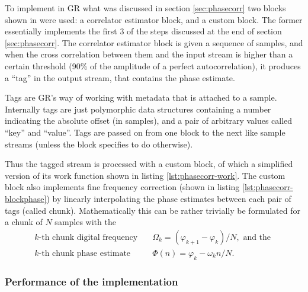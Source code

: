 To implement in GR what was discussed in section \ref{sec:phasecorr} two blocks shown in  were used: a correlator estimator block, and a custom block. The former essentially implements the first 3 of the steps discussed at the end of section \ref{sec:phasecorr}. The correlator estimator block is given a sequence of samples, and when the cross correlation between them and the input stream is higher than a certain threshold (90\% of the amplitude of a perfect autocorrelation), it produces a ``tag'' in the output stream, that contains the phase estimate.

Tags are GR's way of working with metadata that is attached to a sample. Internally tags are just polymorphic data structures containing a number indicating the absolute offset (in samples), and a pair of arbitrary values called ``key'' and ``value''. Tags are passed on from one block to the next like sample streams (unless the block specifies to do otherwise).

Thus the tagged stream is processed with a custom block, of which a simplified version of its work function shown in listing \ref{lst:phasecorr-work}. The custom block also implements fine frequency correction (shown in listing \ref{lst:phasecorr-blockphase}) by linearly interpolating the phase estimates between each pair of tags (called chunk). Mathematically this can be rather trivially be formulated for a chunk of \(N\) samples with the
\begin{subequations}
	\begin{align}
		k\text{-th chunk digital frequency} \quad  & \Omega_k = (\varphi_{k+1} - \varphi_k) / N, \text{ and the }\\
		k\text{-th chunk phase estimate} \quad & \Phi(n) = \varphi_k - \omega_k n/N.
	\end{align}
\end{subequations}

\subsubsection{Performance of the implementation}

